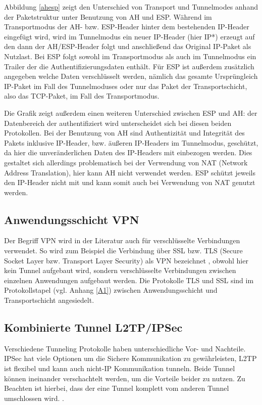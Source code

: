 Abbildung \ref{ahesp} zeigt den Unterschied von Transport und Tunnelmodes anhand der Paketstruktur unter Benutzung von AH und ESP. Während im Transportmodus der AH- bzw. ESP-Header  hinter dem bestehenden IP-Header eingefügt wird, wird im Tunnelmodus ein neuer IP-Header (hier IP*) erzeugt auf den dann der AH/ESP-Header folgt und anschließend das Original IP-Paket als Nutzlast. Bei ESP folgt sowohl im Transportmodus als auch im Tunnelmodus ein Trailer der die Authentifizierungsdaten enthält. Für ESP ist außerdem zusätzlich angegeben welche Daten verschlüsselt werden, nämlich das gesamte Ursprüngleich  IP-Paket im Fall des Tunnelmoduses oder nur das Paket der Transportschicht, also  das TCP-Paket, im Fall des Transportmodus. 

Die Grafik zeigt außerdem einen weiteren Unterschied zwischen ESP und AH: der Datenbereich der authentifiziert wird unterscheidet sich bei diesen beiden Protokollen. Bei der Benutzung von AH sind Authentizität und Integrität des Pakets inklusive IP-Header, bzw. äußeren IP-Headers im Tunnelmodus,  geschützt, da hier die unveränderlichen Daten des IP-Headers mit einbezogen werden. Dies gestaltet sich allerdings problematisch bei der Verwendung von NAT (Network Address Translation), hier kann AH nicht verwendet werden. 
ESP schützt jeweils den IP-Header nicht mit und kann somit auch bei Verwendung von NAT genutzt werden. 

 
\subsection{Anwendungsschicht VPN}

Der Begriff VPN wird in der Literatur auch für verschlüsselte Verbindungen verwendet. So wird zum Beispiel die Verbindung über SSL bzw. TLS (Secure Socket Layer bzw. Transport Layer Security) als VPN bezeichnet \cite{isi-vpn} \cite{singh2012enhancing}, obwohl hier kein Tunnel aufgebaut wird, sondern verschlüsselte Verbindungen zwischen einzelnen Anwendungen aufgebaut werden. Die Protokolle TLS und SSL sind im Protokollstapel (vgl. Anhang \ref{A1}) zwischen Anwendungsschicht und Transportschicht angesiedelt. 

\subsection{Kombinierte Tunnel L2TP/IPSec}

Verschiedene Tunneling Protokolle haben unterschiedliche Vor- und Nachteile.  IPSec hat viele Optionen um die Sichere Kommunikation zu gewährleisten, L2TP ist flexibel und kann auch nicht-IP Kommunikation tunneln. Beide Tunnel können ineinander verschachtelt werden, um die Vorteile beider zu nutzen. Zu Beachten ist hierbei, dass der eine Tunnel komplett vom anderen Tunnel umschlossen wird. \cite{lipp2007vpn}.


